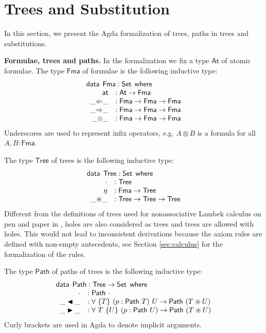 \documentclass[runningheads]{llncs}
\newcommand{\ot}{\otimes}
\newcommand{\cdast}{\circledast}
\newcommand{\Larr}{\Leftarrow}
\newcommand{\Rarr}{\Rightarrow}
\newcommand{\btleft}{\blacktriangleleft}
\newcommand{\btright}{\blacktriangleright}
\newcommand{\At}{\mathsf{At}}
\newcommand{\at}{\mathsf{at}}
\newcommand{\Fma}{\mathsf{Fma}}
\newcommand{\data}{\mathsf{data}}
\newcommand{\Tree}{\mathsf{Tree}}
\newcommand{\Path}{\mathsf{Path}}
\newcommand{\path}[1]{\mathsf{Path} ~ #1}
\newcommand{\where}{\mathsf{where}}
\newcommand{\Set}{\mathsf{Set}}
\begin{document}
\section{Trees and Substitution}
In this section, we present the Agda formalization of trees, paths in trees and substitutions.

\noindent\textbf{Formulae, trees and paths.} In the formalization we fix a type $\At$ of atomic formulae.
The type $\Fma$ of formulae is the following inductive type:
\[
\begin{array}{rl}
  \multicolumn{2}{l}{\data \:\:  \Fma : \Set \:\: \where} \\
  \;\; \at &: \At \to \Fma \\
  \;\; \_{\Larr}\_ &: \Fma \to \Fma \to \Fma \\ 
  \;\; \_{\Rarr}\_ &: \Fma \to \Fma \to \Fma \\ 
  \;\; \_{\ot}\_ &: \Fma \to \Fma \to \Fma \\
\end{array}
\]
Underscores are used to represent infix operators, e.g. $A \ot B$ is a formula for all $A,B : \Fma$.

The type $\Tree$ of trees is the following inductive type:
\[
\begin{array}{rl}
  \multicolumn{2}{l}{\data \:\:  \Tree : \Set \:\: \where} \\
  \;\; \cdot &: \Tree \\
  \;\; \eta &: \Fma \to \Tree \\
  \;\; \_{\cdast}\_ &: \Tree \to \Tree \to \Tree \\
\end{array}
\]
Different from the definitions of trees used for nonassociative Lambek calculus on pen and paper in \cite{moot:categorial:2012}, holes are also considered as trees and trees are allowed with holes. This would not lead to inconsistent derivations because the axiom rules are defined with non-empty antecedents, see Section \ref{sec:calculus} for the formalization of the rules.

The type $\Path$ of paths of trees is the following inductive type:
\[
\begin{array}{rl}
  \multicolumn{2}{l}{\data \:\:  \Path : \Tree \to \Set \:\: \where} \\
  \;\; \cdot &: \path{\cdot} \\
  \;\; \_\btleft\_ &: \forall ~ \{T\} ~ (p : \path{T}) ~ U \to \path{(T \cdast U)} \\
  \;\; \_\btright\_ &: \forall ~ T ~ \{U\} ~ (p : \path{U}) \to \path{(T \cdast U)}
\end{array}
\]
Curly brackets are used in Agda to denote implicit arguments.
\end{document}
